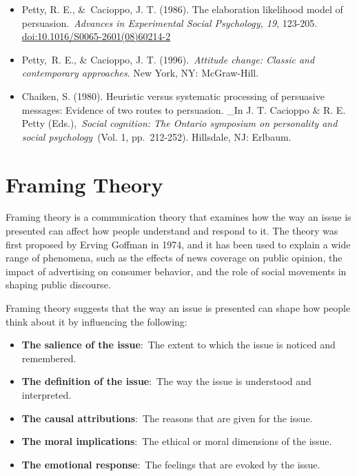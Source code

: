 \documentclass[
  b5paper]{book}
\begin{document}
\begin{itemize}
\item
  Petty, R. E., \&~Cacioppo, J. T. (1986). The elaboration likelihood model of persuasion.~\emph{Advances in Experimental Social Psychology, 19}, 123-205. \url{doi:10.1016/S0065-2601(08)60214-2}
\item
  Petty,~R. E., \& Cacioppo, J. T. (1996).~\emph{Attitude change: Classic and contemporary approaches}. New York, NY: McGraw-Hill.
\item
  Chaiken, S. (1980). Heuristic versus systematic processing of persuasive messages: Evidence of two routes to persuasion. \_In J. T. Cacioppo \& R. E. Petty (Eds.),~\emph{Social cognition: The Ontario symposium on personality and social psychology}~(Vol. 1, pp.~212-252). Hillsdale, NJ: Erlbaum.
\end{itemize}

\hypertarget{framing-theory}{%
\section{Framing Theory}\label{framing-theory}}

Framing theory is a communication theory that examines how the way an issue is presented can affect how people understand and respond to it. The theory was first proposed by Erving Goffman in 1974, and it has been used to explain a wide range of phenomena, such as the effects of news coverage on public opinion, the impact of advertising on consumer behavior, and the role of social movements in shaping public discourse.

Framing theory suggests that the way an issue is presented can shape how people think about it by influencing the following:

\begin{itemize}
\item
  \textbf{The salience of the issue}:~The extent to which the issue is noticed and remembered.
\item
  \textbf{The definition of the issue}:~The way the issue is understood and interpreted.
\item
  \textbf{The causal attributions}:~The reasons that are given for the issue.
\item
  \textbf{The moral implications}:~The ethical or moral dimensions of the issue.
\item
  \textbf{The emotional response}:~The feelings that are evoked by the issue.
\end{itemize}
\end{document}
